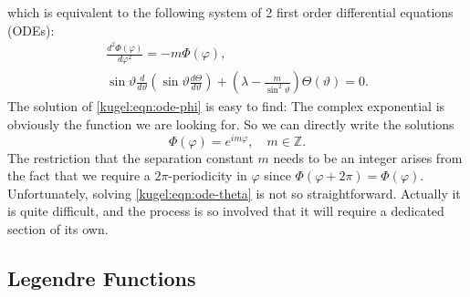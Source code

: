 which is equivalent to the following system of 2 first order differential
equations (ODEs):
\begin{subequations}
  \begin{gather}
    \frac{d^2\Phi(\varphi)}{d\varphi^2} = -m \Phi(\varphi),
      \label{kugel:eqn:ode-phi} \\ 
    \sin \vartheta \frac{d}{d \vartheta} \left(
      \sin \vartheta \frac{d \Theta}{d \vartheta}
    \right)
    + \left( \lambda - \frac{m}{\sin^2 \vartheta} \right)
      \Theta(\vartheta) = 0
      \label{kugel:eqn:ode-theta}.
  \end{gather}
\end{subequations}
The solution of \eqref{kugel:eqn:ode-phi} is easy to find: The complex
exponential is obviously the function we are looking for. So we can directly
write the solutions
\begin{equation} \label{kugel:eqn:ode-phi-sol}
    \Phi(\varphi) = e^{i m \varphi}, \quad m \in \mathbb{Z}.
\end{equation}
The restriction that the separation constant $m$ needs to be an integer arises
from the fact that we require a $2\pi$-periodicity in $\varphi$ since
$\Phi(\varphi + 2\pi) = \Phi(\varphi)$. Unfortunately, solving
\eqref{kugel:eqn:ode-theta} is not so straightforward. Actually it is quite
difficult, and the process is so involved that it will require a dedicated
section of its own.

\subsection{Legendre Functions}

